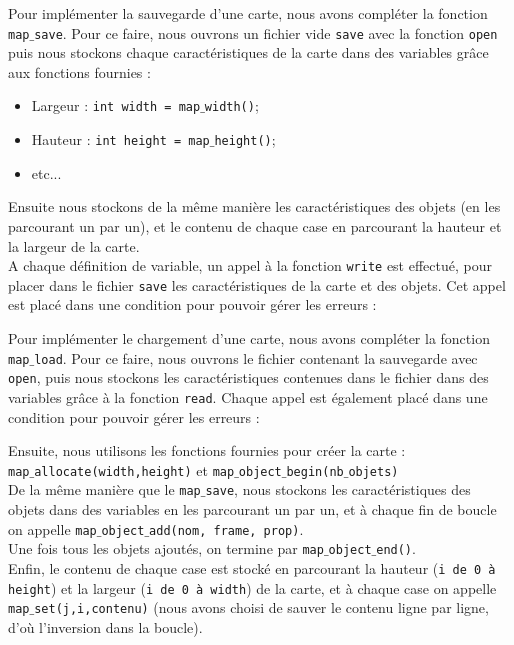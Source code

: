 \documentclass[a4paper, 12pt]{article}
\begin{document}
Pour implémenter la sauvegarde d'une carte, nous avons compléter la fonction \texttt{map$\_$save}.
Pour ce faire, nous ouvrons un fichier vide \texttt{save} avec la fonction \texttt{open} puis nous stockons chaque caractéristiques de la carte dans des variables grâce aux fonctions fournies :
\begin{itemize}
	\item Largeur : \texttt{int width = map$\_$width()};
	\item Hauteur : \texttt{int height = map$\_$height()};
	\item etc...
\end{itemize}
Ensuite nous stockons de la même manière les caractéristiques des objets (en les parcourant un par un), et le contenu de chaque case en parcourant la hauteur et la largeur de la carte. \\
A chaque définition de variable, un appel à la fonction \texttt{write} est effectué, pour placer dans le fichier \texttt{save} les caractéristiques de la carte et des objets. Cet appel est placé dans une condition pour pouvoir gérer les erreurs :
 

Pour implémenter le chargement d'une carte, nous avons compléter la fonction \texttt{map$\_$load}. Pour ce faire, nous ouvrons le fichier contenant la sauvegarde avec \texttt{open}, puis nous stockons les caractéristiques contenues dans le fichier dans des variables grâce à la fonction \texttt{read}. Chaque appel est également placé dans une condition pour pouvoir gérer les erreurs :

Ensuite, nous utilisons les fonctions fournies pour créer la carte : \\
\texttt{map$\_$allocate(width,height)} et \texttt{map$\_$object$\_$begin(nb$\_$objets)}\\
De la même manière que le \texttt{map$\_$save}, nous stockons les caractéristiques des objets dans des variables en les parcourant un par un, et à chaque fin de boucle on appelle \texttt{map$\_$object$\_$add(nom, frame, prop)}. \\
Une fois tous les objets ajoutés, on termine par \texttt{map$\_$object$\_$end()}. \\
Enfin, le contenu de chaque case est stocké en parcourant la hauteur (\texttt{i de 0 à height}) et la largeur (\texttt{i de 0 à width}) de la carte, et à chaque case on appelle \texttt{map$\_$set(j,i,contenu)} (nous avons choisi de sauver le contenu ligne par ligne, d'où l'inversion dans la boucle). \\
\end{document}
